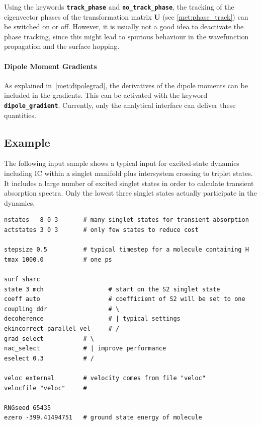\documentclass[a4paper,11pt,DIV=15,openany,twoside=false]{scrbook}
\newcommand{\ttt}[1]{\textbf{\texttt{#1}}}
\newenvironment{example}{
  \vspace{0mm}
  \definecolor{shadecolor}{HTML}{E4F4FF}
  \begin{shaded}
}{
  \end{shaded}
}
\begin{document}
Using the keywords \ttt{track\_phase} and \ttt{no\_track\_phase}, the tracking of the eigenvector phases of the transformation matrix $\mathbf{U}$ (see \ref{met:phase_track}) can be switched on or off. However, it is usually not a good idea to deactivate the phase tracking, since this might lead to spurious behaviour in the wavefunction propagation and the surface hopping.

\paragraph{Dipole Moment Gradients}

As explained in~\ref{met:dipolegrad}, the derivatives of the dipole moments can be included in the gradients. This can be activated with the keyword \ttt{dipole\_gradient}. Currently, only the analytical interface can deliver these quantities.




\subsection{Example}

The following input sample shows a typical input for excited-state dynamics including IC within a singlet manifold plus intersystem crossing to triplet states. It includes a large number of excited singlet states in order to calculate transient absorption spectra. Only the lowest three singlet states actually participate in the dynamics. 

\begin{example}
  \begin{verbatim}
nstates   8 0 3       # many singlet states for transient absorption
actstates 3 0 3       # only few states to reduce cost

stepsize 0.5          # typical timestep for a molecule containing H
tmax 1000.0           # one ps

surf sharc
state 3 mch                  # start on the S2 singlet state
coeff auto                   # coefficient of S2 will be set to one
coupling ddr                 # \
decoherence                  # | typical settings
ekincorrect parallel_vel     # /
grad_select           # \
nac_select            # | improve performance
eselect 0.3           # /

veloc external        # velocity comes from file "veloc"
velocfile "veloc"     #

RNGseed 65435
ezero -399.41494751   # ground state energy of molecule
  \end{verbatim}
\end{example}
\end{document}
